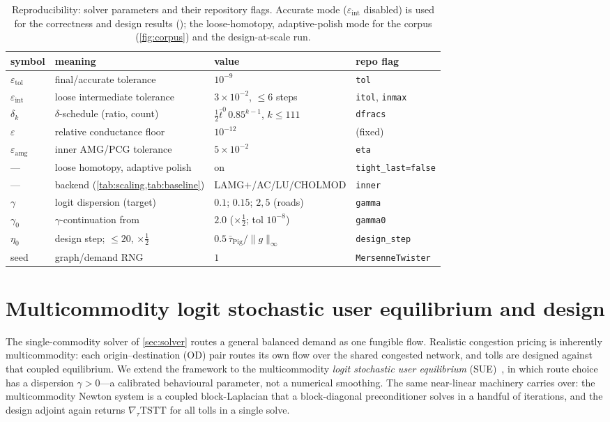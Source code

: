 \documentclass[ijoc]{informs3}
\begin{document}
\begin{table}[t]\centering
\caption{Reproducibility: solver parameters and their repository flags. Accurate mode ($\varepsilon_{\mathrm{int}}$
disabled) is used for the correctness and design results (); the loose-homotopy,
adaptive-polish mode for the corpus (\cref{fig:corpus}) and the design-at-scale run.}
\label{tab:repro}\small
\begin{tabular}{llll}\toprule
symbol & meaning & value & repo flag\\\midrule
$\varepsilon_{\mathrm{tol}}$ & final/accurate tolerance & $10^{-9}$ & \texttt{tol}\\
$\varepsilon_{\mathrm{int}}$ & loose intermediate tolerance & $3\times10^{-2}$, $\le6$ steps & \texttt{itol}, \texttt{inmax}\\
$\delta_k$ & $\delta$-schedule (ratio, count) & $\tfrac12\bar t^0\,0.85^{k-1}$, $k{\le}111$ & \texttt{dfracs}\\
$\varepsilon$ & relative conductance floor & $10^{-12}$ & (fixed)\\
$\varepsilon_{\mathrm{amg}}$ & inner AMG/PCG tolerance & $5\times10^{-2}$ & \texttt{eta}\\
--- & loose homotopy, adaptive polish & on & \texttt{tight\_last=false}\\
--- & backend (\cref{tab:scaling,tab:baseline}) & LAMG$+$/AC/LU/CHOLMOD & \texttt{inner}\\
$\gamma$ & logit dispersion (target) & $0.1$; $0.15$; $2,5$ (roads) & \texttt{gamma}\\
$\gamma_0$ & $\gamma$-continuation from & $2.0$ ($\times\tfrac12$; tol $10^{-8}$) & \texttt{gamma0}\\
$\eta_0$ & design step; $\le20$, $\times\tfrac12$ & $0.5\,\bar\tau_{\mathrm{Pig}}/\|g\|_\infty$ & \texttt{design\_step}\\
seed & graph/demand RNG & $1$ & \texttt{MersenneTwister}\\
\bottomrule
\end{tabular}
\end{table}

\section{Multicommodity logit stochastic user equilibrium and design}\label{sec:mc}
The single-commodity solver of \cref{sec:solver} routes a general balanced demand as one fungible flow.
Realistic congestion pricing is inherently multicommodity: each origin--destination (OD) pair routes its
own flow over the shared congested network, and tolls are designed against that coupled equilibrium. We extend
the framework to the multicommodity \emph{logit stochastic user equilibrium} (SUE)~\citep{fisk1980,daganzo1977},
in which route choice has a dispersion $\gamma>0$---a calibrated behavioural parameter, not a numerical
smoothing. The same near-linear machinery carries over: the multicommodity Newton system is a coupled
block-Laplacian that a block-diagonal preconditioner solves in a handful of iterations, and the design
adjoint again returns $\nabla_\tau\mathrm{TSTT}$ for all tolls in a single solve.
\end{document}
